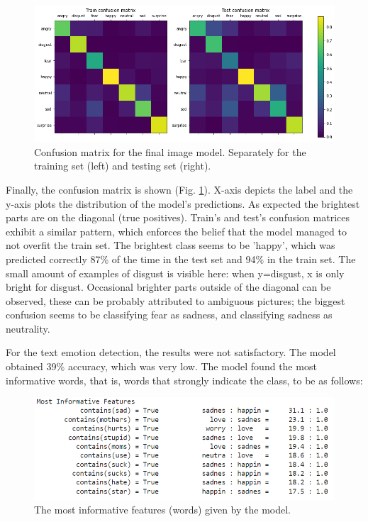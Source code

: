 \documentclass{ledger}
\begin{document}
\begin{figure}[H]
	\centering
	\includegraphics[width=1\textwidth]{assets/image_conf_matrix.png}
	\caption{Confusion matrix for the final image model. Separately for the training set (left) and testing set (right).}
	\label{fig:image-conf-mat}
\end{figure}

Finally, the confusion matrix is shown (Fig. \ref{fig:image-conf-mat}). X-axis depicts the label and the y-axis plots the distribution of the model's predictions. As expected the brightest parts are on the diagonal (true positives). Train's and test's confusion matrices exhibit a similar pattern, which enforces the belief that the model managed to not overfit the train set. The brightest class seems to be 'happy', which was predicted correctly 87\% of the time in the test set and 94\% in the train set. The small amount of examples of disgust is visible here: when y=disgust, x is only bright for disgust. Occasional brighter parts outside of the diagonal can be observed, these can be probably attributed to ambiguous pictures; the biggest confusion seems to be classifying fear as sadness, and classifying sadness as neutrality.

\hfill

For the text emotion detection, the results were not satisfactory. The model obtained 39\% accuracy, which was very low. The model found the most informative words, that is, words that strongly indicate the class, to be as follows:

\begin{figure}[H]
	\centering
	\includegraphics[width=1\textwidth]{assets/text_inf_features.png}
	\caption{The most informative features (words) given by the model.}
	\label{fig:image-training-results}
\end{figure}
\end{document}
